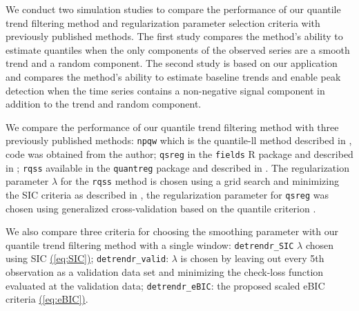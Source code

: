 \documentclass[12pt]{article}
\newcommand{\Eqn}[1]{\hyperref[eq:#1]{{\rm (\ref*{eq:#1})}}} %
\newcommand{\Eqn}[1]{{(\ref{eq:#1})}} %
\begin{document}
	We conduct two simulation studies to compare the performance of our quantile trend filtering method and regularization parameter selection criteria with previously published methods. The first study compares the method's ability to estimate quantiles when the only components of the observed series are a smooth trend and a random component. The second study is based on our application and compares the method's ability to estimate baseline trends and enable peak detection when the time series contains a non-negative signal component in addition to the trend and random component. 
	
	We compare the performance of our quantile trend filtering method with three previously published methods: \texttt{npqw} which is the quantile-ll method described in \cite{Racine2017}, code was obtained from the author; \texttt{qsreg} in the \texttt{fields} R package and described in \cite{Oh2011, nychka1995nonparametric}; \texttt{rqss} available in the \texttt{quantreg} package and described in \cite{KoenkerNgPortnoy1994}.  The regularization parameter $\lambda$ for the \texttt{rqss} method is chosen using a grid search and minimizing the SIC criteria as described in \cite{KoenkerNgPortnoy1994}, the regularization parameter for \texttt{qsreg} was chosen using generalized cross-validation based on the quantile criterion \cite{Oh2011}. 
	
	We also compare three criteria for choosing the smoothing parameter with our quantile trend filtering method with a single window: \texttt{detrendr\_SIC} $\lambda$ chosen using SIC \Eqn{SIC}\citep{KoenkerNgPortnoy1994}; \texttt{detrendr\_valid}: $\lambda$ is chosen by leaving out every 5th observation as a validation data set and minimizing the check-loss function evaluated at the validation data; \texttt{detrendr\_eBIC}:  the proposed scaled eBIC criteria \Eqn{eBIC}. 
	
	 
\end{document}
